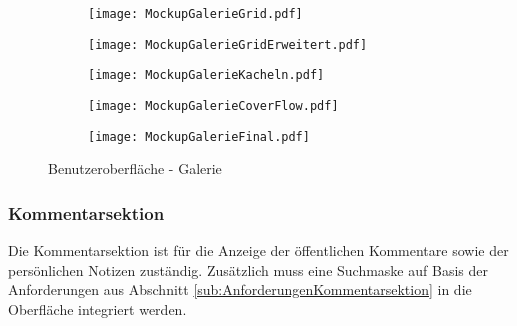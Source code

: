 \begin{figure}[h!]
\begin{subfigure}[c]{0.5\textwidth}
\texttt{[image: MockupGalerieGrid.pdf]}
\label{fig:MockupGalerieGrid}
\end{subfigure}%
\begin{subfigure}[c]{0.5\textwidth}
\texttt{[image: MockupGalerieGridErweitert.pdf]}
\label{fig:MockupGalerieGridErweitert}
\end{subfigure}
\par\bigskip
\begin{subfigure}[c]{0.5\textwidth}
\texttt{[image: MockupGalerieKacheln.pdf]}
\label{fig:MockupGalerieKacheln}
\end{subfigure}%
\begin{subfigure}[c]{0.5\textwidth}
\texttt{[image: MockupGalerieCoverFlow.pdf]}
\label{fig:MockupGalerieCoverFlow}
\end{subfigure}
\par\bigskip
\begin{subfigure}[c]{\textwidth}
\texttt{[image: MockupGalerieFinal.pdf]}
\label{fig:MockupGalerieFinal}
\end{subfigure}
\caption{Benutzeroberfläche - Galerie}
\label{fig:MockupGalerie}
\end{figure}



\subsubsection{Kommentarsektion}
Die Kommentarsektion ist für die Anzeige der öffentlichen Kommentare sowie der persönlichen Notizen zuständig. Zusätzlich muss eine Suchmaske auf Basis der Anforderungen aus Abschnitt \ref{sub:AnforderungenKommentarsektion} in die Oberfläche integriert werden.

